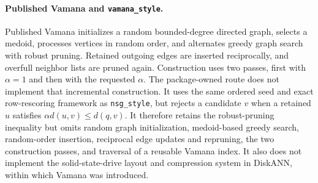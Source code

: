 \documentclass[11pt]{article}
\newcommand{\code}[1]{\texttt{#1}}
\begin{document}
\paragraph{Published Vamana and \code{vamana\_style}.}
Published Vamana initializes a random bounded-degree directed graph, selects a
medoid, processes vertices in random order, and alternates greedy graph search
with robust pruning. Retained outgoing edges are inserted reciprocally, and
overfull neighbor lists are pruned again. Construction uses two passes, first
with $\alpha=1$ and then with the requested $\alpha$. The package-owned route
does not implement that incremental construction. It uses the same ordered
seed and exact row-rescoring framework as \code{nsg\_style}, but rejects a
candidate $v$ when a retained $u$ satisfies
$\alpha d(u,v)\leq d(q,v)$. It therefore retains the robust-pruning inequality
but omits random graph initialization, medoid-based greedy search, random-order
insertion, reciprocal edge updates and repruning, the two construction passes,
and traversal of a reusable Vamana index. It also does not implement the
solid-state-drive layout and compression system in DiskANN, within which
Vamana was introduced.
\end{document}
